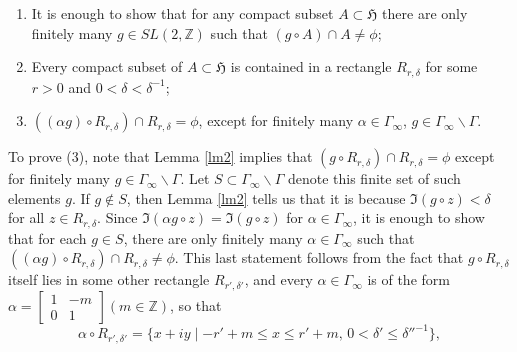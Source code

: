 \begin{enumerate}
  \item It is enough to show that for any compact subset $A \subset \mathfrak{H}$ there are only finitely many $g \in SL(2, \mathbb{Z})$ such that $(g \circ A) \cap A \neq \phi$;

  \item Every compact subset of $A \subset \mathfrak{H}$ is contained in a rectangle $R_{r,\delta}$ for some $r > 0$ and $0 < \delta < \delta^{-1}$;

  \item $((\alpha g) \circ R_{r,\delta}) \cap R_{r,\delta} = \phi$, except for finitely many $\alpha \in \Gamma_{\infty}$, $g \in \Gamma_{\infty}\backslash \Gamma$.
\end{enumerate}

To prove (3), note that Lemma \ref{lm2} implies that $(g \circ R_{r,\delta}) \cap R_{r,\delta} = \phi$ except for finitely many $g \in \Gamma_{\infty}\backslash \Gamma$. Let $S \subset \Gamma_{\infty}\backslash \Gamma$ denote this finite set of such elements $g$. If $g \not\in S$, then Lemma \ref{lm2} tells us that it is because $\Im(g \circ z) < \delta$ for all $z \in R_{r,\delta}$. Since $\Im(\alpha g \circ z) = \Im(g \circ z)$ for $\alpha \in \Gamma_{\infty}$, it is enough to show that for each $g \in S$, there are only finitely many $\alpha \in \Gamma_{\infty}$ such that $((\alpha g) \circ R_{r,\delta}) \cap R_{r,\delta} \neq \phi$. This last statement follows from the fact that $g \circ R_{r,\delta}$ itself lies in some other rectangle $R_{r',\delta'}$, and every $\alpha \in \Gamma_{\infty}$ is of the form $\alpha =
  \begin{bmatrix}
    1 & -m \\
    0 & 1
  \end{bmatrix}
  (m \in \mathbb{Z})$, so that
\[
  \alpha \circ R_{r',\delta'} = \{x + iy \mid -r' + m \leq x \leq r' + m, \, 0 < \delta' \leq \delta''^{-1}\},
\]

